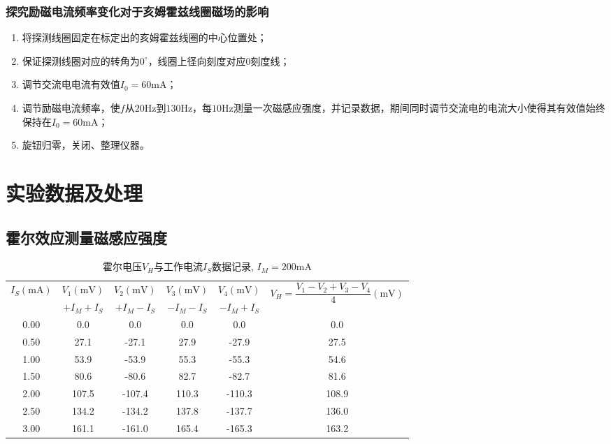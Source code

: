 \documentclass[zihao=5, UTF8]{article}
\theoremstyle{MyLineTheoremStyle} %
\theoremstyle{MyBlockTheoremStyle} %
\theoremstyle{MySubsubsectionStyle} %
\begin{document}
\subsubsection{探究励磁电流频率变化对于亥姆霍兹线圈磁场的影响}
\begin{enumerate}
    \item 将探测线圈固定在标定出的亥姆霍兹线圈的中心位置处；
    \item 保证探测线圈对应的转角为$0^\circ$，线圈上径向刻度对应0刻度线；
    \item 调节交流电电流有效值$I_0=60\text{mA}$；
    \item 调节励磁电流频率，使$f$从$20\text{Hz}$到$130\text{Hz}$，每$10\text{Hz}$测量一次磁感应强度，并记录数据，期间同时调节交流电的电流大小使得其有效值始终保持在$I_0=60\text{mA}$；
    \item 旋钮归零，关闭、整理仪器。
\end{enumerate}

\section{实验数据及处理}

\subsection{霍尔效应测量磁感应强度}
\begin{table}[H]
\centering
\begin{tabular}{|c|c|c|c|c|c|} 
\hline
\multirow{2}{*}{$I_S(\mathrm{mA})$} & $V_1(\mathrm{mV})$   & $V_2(\mathrm{mV})$  & $V_3(\mathrm{mV})$  & $V_4(\mathrm{mV})$  & \multirow{2}{*}{$V_H = \dfrac{V_1 - V_2 + V_3 - V_4}{4}(\mathrm{mV})$}  \\ 
\cline{2-5}
& $+I_M +I_S$ & $+I_M -I_S$ & $-I_M -I_S$ & $-I_M +I_S$ &                         \\ 
\hline
0.00                    & 0.0      & 0.0     & 0.0        & 0.0     & 0.0                     \\ 
\hline
0.50                    & 27.1     & -27.1   & 27.9       & -27.9   & 27.5                    \\ 
\hline
1.00                    & 53.9     & -53.9   & 55.3       & -55.3   & 54.6                    \\ 
\hline
1.50                    & 80.6     & -80.6   & 82.7       & -82.7   & 81.6                    \\ 
\hline
2.00                    & 107.5    & -107.4  & 110.3      & -110.3  & 108.9                   \\ 
\hline
2.50                    & 134.2    & -134.2  & 137.8      & -137.7  & 136.0                   \\ 
\hline
3.00                    & 161.1    & -161.0  & 165.4      & -165.3  & 163.2                   \\
\hline
\end{tabular}
\caption{霍尔电压$V_H$与工作电流$I_S$数据记录, $I_M = 200\mathrm{mA}$}
\end{table}
\end{document}
